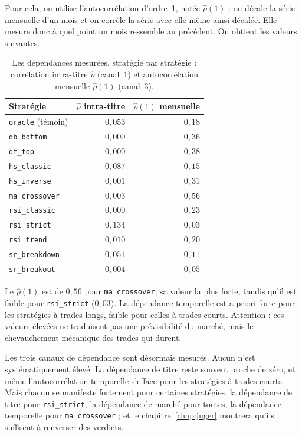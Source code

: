Pour cela, on utilise l'autocorrélation d'ordre~1, notée
$\hat\rho(1)$ : on décale la série mensuelle d'un mois et on corrèle la série
avec elle-même ainsi décalée. Elle mesure donc à quel point un mois ressemble
au précédent. On obtient les valeurs suivantes.
\begin{table}[H]
\centering
\caption{Les dépendances mesurées, stratégie par stratégie :
corrélation intra-titre $\hat\rho$ (canal~1) et autocorrélation
mensuelle $\hat\rho(1)$ (canal~3).}
\label{tab:dep-mesures}
\small
\begin{tabular}{@{}lrr@{}}
\toprule
Stratégie & $\hat\rho$ intra-titre & $\hat\rho(1)$ mensuelle \\
\midrule
\texttt{oracle} (témoin) & $0{,}053$ & $0{,}18$ \\
\midrule
\texttt{db\_bottom}    & $0{,}000$ & $0{,}36$ \\
\texttt{dt\_top}       & $0{,}000$ & $0{,}38$ \\
\texttt{hs\_classic}   & $0{,}087$ & $0{,}15$ \\
\texttt{hs\_inverse}   & $0{,}001$ & $0{,}31$ \\
\texttt{ma\_crossover} & $0{,}003$ & $0{,}56$ \\
\texttt{rsi\_classic}  & $0{,}000$ & $0{,}23$ \\
\texttt{rsi\_strict}   & $0{,}134$ & $0{,}03$ \\
\texttt{rsi\_trend}    & $0{,}010$ & $0{,}20$ \\
\texttt{sr\_breakdown} & $0{,}051$ & $0{,}11$ \\
\texttt{sr\_breakout}  & $0{,}004$ & $0{,}05$ \\
\bottomrule
\end{tabular}
\end{table}

Le $\hat\rho(1)$ est de $0{,}56$ pour \texttt{ma\_crossover}, sa valeur la plus
forte, tandis qu'il est faible pour \texttt{rsi\_strict} ($0{,}03$).
La dépendance temporelle est a priori forte pour les stratégies
à trades longs, faible pour celles à trades courts. Attention :
ces valeurs élevées ne traduisent pas une prévisibilité du
marché, mais le chevauchement mécanique des trades qui durent.

Les trois canaux de dépendance sont désormais mesurés. Aucun n'est
systématiquement élevé. La dépendance de titre reste souvent proche de zéro,
et même l'autocorrélation temporelle s'efface pour les stratégies à trades
courts. Mais chacun se manifeste fortement pour certaines stratégies, la
dépendance de titre pour \texttt{rsi\_strict}, la dépendance de marché pour
toutes, la dépendance temporelle pour \texttt{ma\_crossover} ; et le
chapitre~\ref{chap:juger} montrera qu'ils suffisent à renverser des verdicts.

